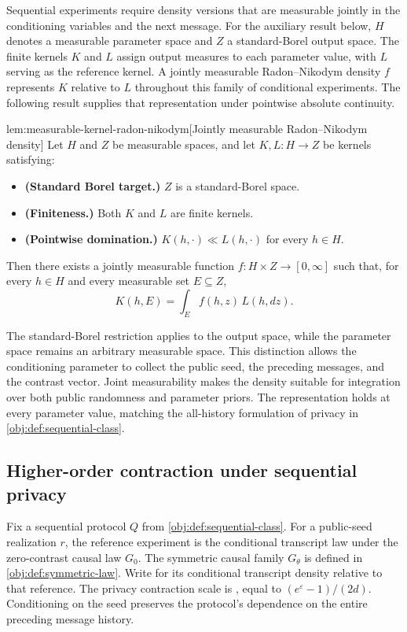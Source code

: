 \documentclass[11pt]{article}
\begin{document}
Sequential experiments require density versions that are measurable jointly in the conditioning variables and the next message. For the auxiliary result below, \(H\) denotes a measurable parameter space and \(Z\) a standard-Borel output space. The finite kernels \(K\) and \(L\) assign output measures to each parameter value, with \(L\) serving as the reference kernel. A jointly measurable Radon--Nikodym density \(f\) represents \(K\) relative to \(L\) throughout this family of conditional experiments. The following result supplies that representation under pointwise absolute continuity.

\begin{theoremv}{lem:measurable-kernel-radon-nikodym}[Jointly measurable Radon–Nikodym density]
Let \(H\) and \(Z\) be measurable spaces, and let \(K,L:H\to Z\) be kernels satisfying:
\begin{itemize}
\item \textbf{(Standard Borel target.)} \(Z\) is a standard-Borel space.
\item \textbf{(Finiteness.)} Both \(K\) and \(L\) are finite kernels.
\item \textbf{(Pointwise domination.)} \(K(h,\cdot)\ll L(h,\cdot)\) for every \(h\in H\).
\end{itemize}
Then there exists a jointly measurable function \(f:H\times Z\to[0,\infty]\) such that, for every \(h\in H\) and every measurable set \(E\subseteq Z\),
\[
K(h,E)=\int_E f(h,z)\,L(h,dz).
\]
\end{theoremv}

The standard-Borel restriction applies to the output space, while the parameter space remains an arbitrary measurable space. This distinction allows the conditioning parameter to collect the public seed, the preceding messages, and the contrast vector. Joint measurability makes the density suitable for integration over both public randomness and parameter priors. The representation holds at every parameter value, matching the all-history formulation of privacy in \cref{obj:def:sequential-class}.

\subsection{Higher-order contraction under sequential privacy}

Fix a sequential protocol \(Q\) from \cref{obj:def:sequential-class}. For a public-seed realization \(r\), the reference experiment is the conditional transcript law under the zero-contrast causal law \(G_0\). The symmetric causal family \(G_\theta\) is defined in \cref{obj:def:symmetric-law}. Write  for its conditional transcript density relative to that reference. The privacy contraction scale is , equal to \((e^\varepsilon-1)/(2d)\). Conditioning on the seed preserves the protocol's dependence on the entire preceding message history.
\end{document}
